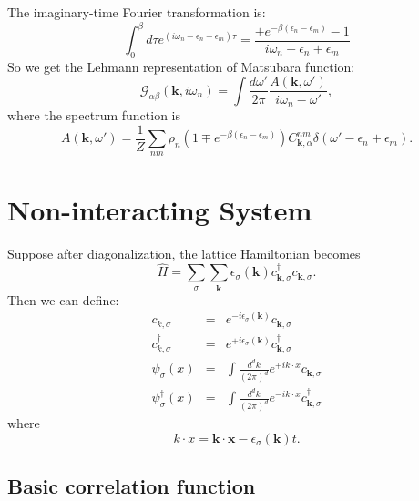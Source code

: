 \documentclass[journal=jacsat,manuscript=article]{achemso}
\begin{document}
The imaginary-time Fourier transformation is:
\begin{equation}
	\int_{0}^{\beta}d\tau e^{\left(i\omega_{n}-\epsilon_{n}+\epsilon_{m}\right)\tau}=\frac{\pm e^{-\beta\left(\epsilon_{n}-\epsilon_{m}\right)}-1}{i\omega_{n}-\epsilon_{n}+\epsilon_{m}}
\end{equation}
So we get the Lehmann representation of Matsubara function:
\begin{equation}
	\mathcal{G}_{\alpha\beta}\left(\bm{k},i\omega_{n}\right)=\int\frac{d\omega'}{2\pi}\frac{A\left(\bm{k},\omega'\right)}{i\omega_{n}-\omega'},
\end{equation}
where the spectrum function is
\begin{equation}
	A\left(\bm{k},\omega'\right)=\frac{1}{Z}\sum_{nm}\rho_{n}\left(1\mp e^{-\beta\left(\epsilon_{n}-\epsilon_{m}\right)}\right)C_{\bm{k},\alpha}^{nm}\delta\left(\omega'-\epsilon_{n}+\epsilon_{m}\right).
\end{equation}


\section{Non-interacting System}

Suppose after diagonalization, the lattice Hamiltonian becomes
\begin{equation}
	\hat{H}=\sum_{\sigma}\sum_{\bm{k}}\epsilon_{\sigma}\left(\bm{k}\right)c_{\bm{k},\sigma}^{\dagger}c_{\bm{k},\sigma}.
\end{equation}
Then we can define:
\begin{eqnarray}
	c_{k,\sigma} & = & e^{-i\epsilon_{\sigma}\left(\bm{k}\right)}c_{\bm{k},\sigma}\\
	c_{k,\sigma}^{\dagger} & = & e^{+i\epsilon_{\sigma}\left(\bm{k}\right)}c_{\bm{k},\sigma}^{\dagger}\\
	\psi_{\sigma}\left(x\right) & = & \int\frac{d^{d}k}{\left(2\pi\right)^{d}}e^{+ik\cdot x}c_{\bm{k},\sigma}\\
	\psi_{\sigma}^{\dagger}\left(x\right) & = & \int\frac{d^{d}k}{\left(2\pi\right)^{d}}e^{-ik\cdot x}c_{\bm{k},\sigma}^{\dagger}
\end{eqnarray}
where
\begin{equation}
	k\cdot x=\bm{k}\cdot\bm{x}-\epsilon_{\sigma}\left(\bm{k}\right)t.
\end{equation}


\subsection{Basic correlation function}
\end{document}

